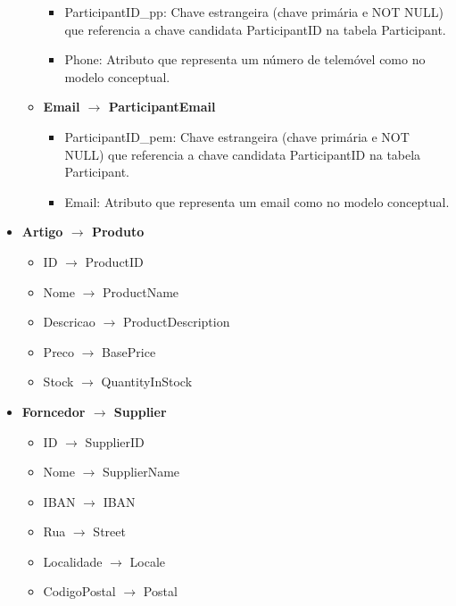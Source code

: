 \documentclass[a4paper,12pt]{scrreprt}
\begin{document}
\begin{itemize}
\begin{itemize}
                    \begin{itemize}
                        \item{ParticipantID\_pp:} Chave estrangeira (chave primária e NOT NULL) que referencia 
                        a chave candidata ParticipantID na tabela Participant.
                        \item{Phone:} Atributo que representa um número de telemóvel como no modelo conceptual.
                    \end{itemize}
                \item{\textbf{Email $\rightarrow$ ParticipantEmail}}
                    \begin{itemize}
                        \item{ParticipantID\_pem:} Chave estrangeira (chave primária e NOT NULL) que referencia a chave candidata ParticipantID na tabela Participant.
                        \item{Email:} Atributo que representa um email como no modelo conceptual.
                    \end{itemize}
            \end{itemize}
        \item{\textbf{Artigo $\rightarrow$ Produto}}
            \begin{itemize}
                \item{ID $\rightarrow$ ProductID}
                \item{Nome $\rightarrow$ ProductName}
                \item{Descricao $\rightarrow$ ProductDescription}
                \item{Preco $\rightarrow$ BasePrice}
                \item{Stock $\rightarrow$ QuantityInStock}
            \end{itemize}
        \item{\textbf{Forncedor $\rightarrow$ Supplier}}
            \begin{itemize}
                \item{ID $\rightarrow$ SupplierID}
                \item{Nome $\rightarrow$ SupplierName}
                \item{IBAN $\rightarrow$ IBAN}
                \item{Rua $\rightarrow$ Street}
                \item{Localidade $\rightarrow$ Locale}
                \item{CodigoPostal $\rightarrow$ Postal}

\end{itemize}
\end{itemize}
\end{document}
